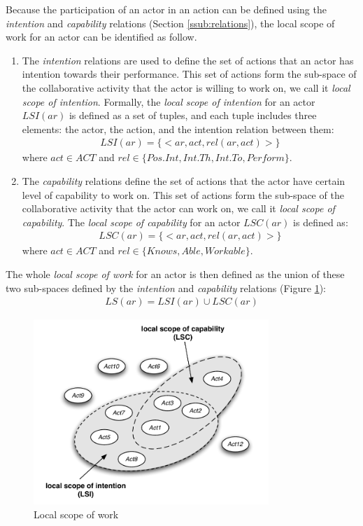 Because the participation of an actor in an action can be defined using the \emph{intention} and \emph{capability} relations (Section \ref{ssub:relations}), the local scope of work for an actor can be identified as follow. 

\begin{enumerate}
	\item The \emph{intention} relations are used to define the set of actions that an actor has intention towards their performance. This set of actions form the sub-space of the collaborative activity that the actor is willing to work on, we call it \emph{local scope of intention}. Formally, the \emph{local scope of intention} for an actor $LSI(ar)$ is defined as a set of tuples, and each tuple includes three elements: the actor, the action, and the intention relation between them:
		\begin{align*} 
			LSI(ar) = \{<ar, act, rel(ar, act)>\}
		\end{align*}
		where $act\in ACT$ and $rel\in \{Pos.Int, Int.Th, Int.To, Perform\}$.
	\item The \emph{capability} relations define the set of actions that the actor have certain level of capability to work on. This set of actions form the sub-space of the collaborative activity that the actor can work on, we call it \emph{local scope of capability}. The \emph{local scope of capability} for an actor $LSC(ar)$ is defined as:
		\begin{align*} 
			LSC(ar) = \{<ar, act, rel(ar, act)>\}
		\end{align*}
		where $act\in ACT$ and $rel\in \{Knows, Able, Workable\}$.
\end{enumerate}

The whole \emph{local scope of work} for an actor is then defined as the union of these two sub-spaces defined by the \emph{intention} and \emph{capability} relations (Figure \ref{fig:local_scope}):
\begin{align*} 
	LS(ar) = LSI(ar) \cup LSC(ar)
\end{align*}

\begin{figure}[htbp] %
   \centering
   \includegraphics[width=3.5in]{local_scope.pdf} 
   \caption{Local scope of work}
   \label{fig:local_scope}
\end{figure}


